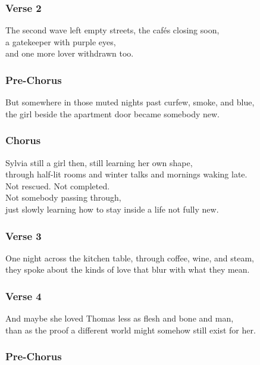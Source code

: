 \subsubsection{Verse 2}\label{verse-2-9}

The second wave left empty streets, the cafés closing soon,\\
a gatekeeper with purple eyes,\\
and one more lover withdrawn too.

\subsubsection{Pre-Chorus}\label{pre-chorus-20}

But somewhere in those muted nights past curfew, smoke, and blue,\\
the girl beside the apartment door became somebody new.

\subsubsection{Chorus}\label{chorus-30}

Sylvia still a girl then, still learning her own shape,\\
through half-lit rooms and winter talks and mornings waking late.\\
Not rescued. Not completed.\\
Not somebody passing through,\\
just slowly learning how to stay inside a life not fully new.

\subsubsection{Verse 3}\label{verse-3-6}

One night across the kitchen table, through coffee, wine, and steam,\\
they spoke about the kinds of love that blur with what they mean.

\subsubsection{Verse 4}\label{verse-4-5}

And maybe she loved Thomas less as flesh and bone and man,\\
than as the proof a different world might somehow still exist for her.

\subsubsection{Pre-Chorus}\label{pre-chorus-21}

